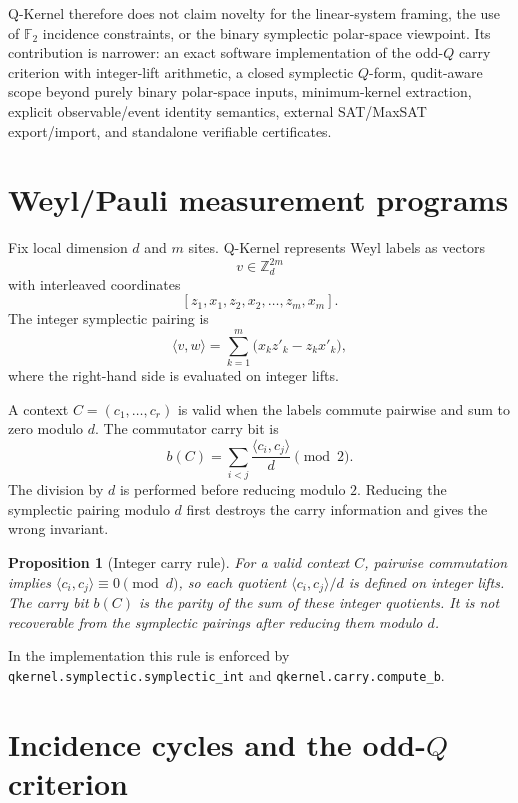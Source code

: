 \documentclass[11pt]{article}
\newtheorem{proposition}{Proposition}
\begin{document}
Q-Kernel therefore does not claim novelty for the linear-system framing, the use of \(\mathbb{F}_2\) incidence constraints, or the binary symplectic polar-space viewpoint.  Its contribution is narrower: an exact software implementation of the odd-\(Q\) carry criterion with integer-lift arithmetic, a closed symplectic \(Q\)-form, qudit-aware scope beyond purely binary polar-space inputs, minimum-kernel extraction, explicit observable/event identity semantics, external SAT/MaxSAT export/import, and standalone verifiable certificates.

\section{Weyl/Pauli measurement programs}

Fix local dimension \(d\) and \(m\) sites.  Q-Kernel represents Weyl labels as vectors
\[
  v \in \mathbb{Z}_d^{2m}
\]
with interleaved coordinates
\[
  [z_1,x_1,z_2,x_2,\ldots,z_m,x_m].
\]
The integer symplectic pairing is
\[
  \langle v,w\rangle
  =
  \sum_{k=1}^{m}
  \bigl(x_k z'_k - z_k x'_k\bigr),
\]
where the right-hand side is evaluated on integer lifts.

A context \(C=(c_1,\ldots,c_r)\) is valid when the labels commute pairwise and sum to zero modulo \(d\).  The commutator carry bit is
\[
  b(C)=
  \sum_{i<j}
  \frac{\langle c_i,c_j\rangle}{d}
  \pmod 2.
\]
The division by \(d\) is performed before reducing modulo \(2\).  Reducing the symplectic pairing modulo \(d\) first destroys the carry information and gives the wrong invariant.

\begin{proposition}[Integer carry rule]
\label{prop:integer-carry}
For a valid context \(C\), pairwise commutation implies \(\langle c_i,c_j\rangle\equiv 0\pmod d\), so each quotient \(\langle c_i,c_j\rangle/d\) is defined on integer lifts.  The carry bit \(b(C)\) is the parity of the sum of these integer quotients.  It is not recoverable from the symplectic pairings after reducing them modulo \(d\).
\end{proposition}

In the implementation this rule is enforced by \texttt{qkernel.symplectic.symplectic\_int} and \texttt{qkernel.carry.compute\_b}.

\section{Incidence cycles and the odd-\(Q\) criterion}
\end{document}
